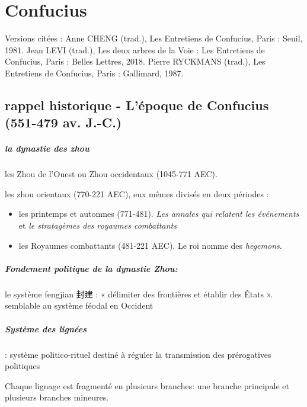 \chapter{Confucius}  

Versions citées : Anne CHENG (trad.), Les Entretiens de Confucius, Paris : Seuil, 1981.  Jean LEVI (trad.), Les deux arbres de la Voie : Les Entretiens de Confucius, Paris : Belles Lettres, 2018.   Pierre RYCKMANS (trad.), Les Entretiens de Confucius, Paris : Gallimard, 1987.  

\section{rappel historique - L’époque de Confucius (551-479 av. J.-C.)}

\paragraph{la dynastie des zhou}
 
les Zhou de l’Ouest ou Zhou occidentaux (1045-771 AEC).
 
 
les zhou orientaux (770-221 AEC), eux mêmes divisés en deux périodes : 
\begin{itemize}
    \item les printemps et automnes (771-481). \textit{Les annales qui relatent les événements} et \textit{le stratagèmes des royaumes combattants}
    \item les Royaumes combattants (481-221 AEC). Le roi nomme des \textit{hegemons}. 
\end{itemize}

\paragraph{Fondement politique de la dynastie Zhou:}  le système fengjian   封建 : « délimiter des frontières et établir des États ».	semblable au système féodal en Occident




\paragraph{Système des lignées } : système politico-rituel destiné à réguler la transmission des prérogatives politiques



Chaque lignage est fragmenté en plusieurs branches: une branche principale et plusieurs branches mineures.


